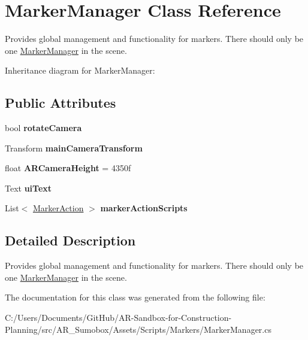 \hypertarget{class_marker_manager}{}\section{Marker\+Manager Class Reference}
\label{class_marker_manager}


Provides global management and functionality for markers. There should only be one \mbox{\hyperlink{class_marker_manager}{Marker\+Manager}} in the scene.  


Inheritance diagram for Marker\+Manager\+:\begin{figure}[H]
\begin{center}
\leavevmode
\end{center}
\end{figure}
\subsection*{Public Attributes}
\begin{DoxyCompactItemize}
\item 
\mbox{\label{class_marker_manager_ad1f6646bd6df32dfdaa87a814c198d51}} 
bool {\bfseries rotate\+Camera}
\item 
\mbox{\label{class_marker_manager_a50a6b1c1c25f506d9968e1b807d1d612}} 
Transform {\bfseries main\+Camera\+Transform}
\item 
\mbox{\label{class_marker_manager_a7eef0899be6cc08414b0c7307ee888ae}} 
float {\bfseries A\+R\+Camera\+Height} = 4350f
\item 
\mbox{\label{class_marker_manager_af09a4afd3d2d5e11198e6909e7700c84}} 
Text {\bfseries ui\+Text}
\item 
\mbox{\label{class_marker_manager_ac424088fb0b9b0b348b463f12648bf70}} 
List$<$ \mbox{\hyperlink{class_marker_action}{Marker\+Action}} $>$ {\bfseries marker\+Action\+Scripts}
\end{DoxyCompactItemize}


\subsection{Detailed Description}
Provides global management and functionality for markers. There should only be one \mbox{\hyperlink{class_marker_manager}{Marker\+Manager}} in the scene. 



The documentation for this class was generated from the following file\+:\begin{DoxyCompactItemize}
\item 
C\+:/\+Users/\+Documents/\+Git\+Hub/\+A\+R-\/\+Sandbox-\/for-\/\+Construction-\/\+Planning/src/\+A\+R\+\_\+\+Sumobox/\+Assets/\+Scripts/\+Markers/Marker\+Manager.\+cs\end{DoxyCompactItemize}
